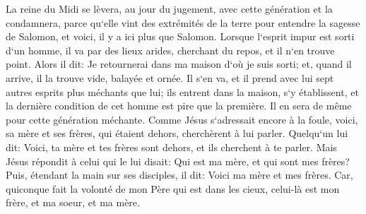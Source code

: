 \verse La reine du Midi se lèvera, au jour du jugement, avec cette génération et la condamnera, parce qu`elle vint des extrémités de la terre pour entendre la sagesse de Salomon, et voici, il y a ici plus que Salomon. 
\verse Lorsque l`esprit impur est sorti d`un homme, il va par des lieux arides, cherchant du repos, et il n`en trouve point. 
\verse Alors il dit: Je retournerai dans ma maison d`où je suis sorti; et, quand il arrive, il la trouve vide, balayée et ornée. 
\verse Il s`en va, et il prend avec lui sept autres esprits plus méchants que lui; ils entrent dans la maison, s`y établissent, et la dernière condition de cet homme est pire que la première. Il en sera de même pour cette génération méchante. 
\verse Comme Jésus s`adressait encore à la foule, voici, sa mère et ses frères, qui étaient dehors, cherchèrent à lui parler. 
\verse Quelqu`un lui dit: Voici, ta mère et tes frères sont dehors, et ils cherchent à te parler. 
\verse Mais Jésus répondit à celui qui le lui disait: Qui est ma mère, et qui sont mes frères? 
\verse Puis, étendant la main sur ses disciples, il dit: Voici ma mère et mes frères. 
\verse Car, quiconque fait la volonté de mon Père qui est dans les cieux, celui-là est mon frère, et ma soeur, et ma mère. 

\chapter{}

